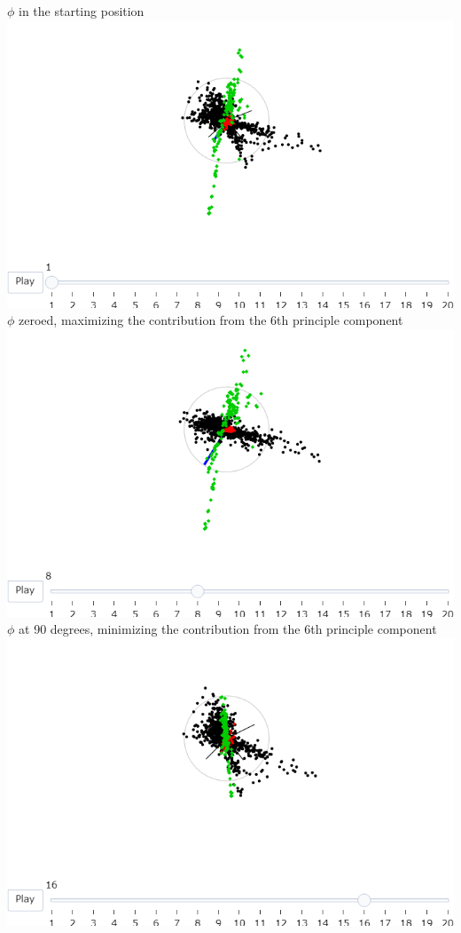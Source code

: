 \documentclass{monashthesis}
\begin{document}
\(\phi\) in the starting position
\includegraphics{./output/fig8_phi_start.png}
\(\phi\) zeroed, maximizing the contribution from the 6th principle component
\includegraphics{./output/fig8_phi0.png}
\(\phi\) at 90 degrees, minimizing the contribution from the 6th principle component
\includegraphics{./output/fig8_phi90.png}
\end{document}
